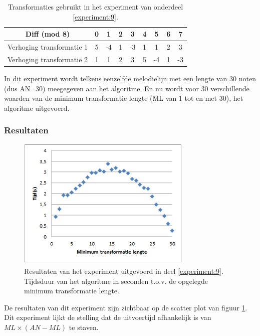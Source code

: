 \begin{table}
  \centering
  \begin{tabular}{c | c c c c c c c c }
    Diff (mod 8) & 0 & 1 & 2 & 3 & 4 & 5 & 6 & 7 \\
    \hline
    \hline
    Verhoging transformatie 1 & 5 & -4 & 1 & -3 & 1 & 1 & 2 & 3 \\
    \hline
    Verhoging transformatie 2 & 1 & 1 & 2 & 3 & 5 & -4 & 1 & -3 \\
  \end{tabular}
  \caption{Transformaties gebruikt in het experiment van onderdeel \ref{experiment:9}.}
  \label{tabel:exp9}
\end{table}

In dit experiment wordt telkens eenzelfde melodielijn met een lengte van 30 noten (dus AN=30) meegegeven aan het algoritme. En nu wordt voor 30 verschillende waarden van de minimum transformatie lengte (ML van 1 tot en met 30), het algoritme uitgevoerd.

\subsubsection{Resultaten}
\begin{figure}[!ht]
  \centering
  \includegraphics[width=0.75\textwidth]{5_Experimenten_Resultaten/exp9_res}
  \caption{Resultaten van het experiment uitgevoerd in deel \ref{experiment:9}. Tijdsduur van het algoritme in seconden t.o.v. de opgelegde minimum transformatie lengte.}
  \label{figuur:exp9}
\end{figure}

De resultaten van dit experiment zijn zichtbaar op de scatter plot van figuur \ref{figuur:exp9}. Dit experiment lijkt de stelling dat de uitvoertijd afhankelijk is van $ML \times (AN-ML)$ te staven.



